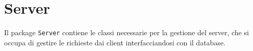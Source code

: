 \section{Server}
Il package \texttt{Server} contiene le classi necessarie per 
la gestione del server, che si occupa di gestire le richieste 
dai client interfacciandosi con il database.
